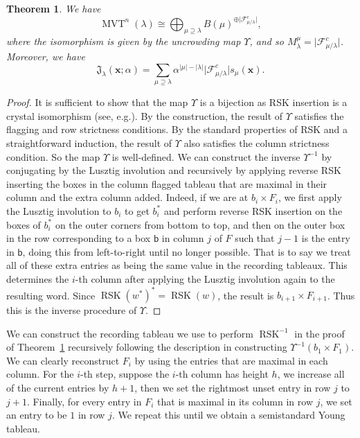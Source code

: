 \documentclass[10pt]{amsart}
\newtheorem{theo}{Theorem}[section]
\theoremstyle{definition}
\providecommand{\eg}{e.g.}
\newcommand{\wG}{\mathfrak{J}}  %
\newcommand{\xx}{\mathbf{x}}
\newcommand{\iso}{\cong}
\newcommand{\bbb}{\mathsf{b}}
\newcommand{\abs}[1]{\lvert #1 \rvert}
\DeclareMathOperator{\mvt}{MVT} %
\DeclareMathOperator{\RSK}{RSK} %
\newcommand{\mcF}{\mathcal{F}}
\begin{document}
\begin{theo}
\label{thm:flagged_decomposition}
We have
\[
\mvt^n(\lambda) \iso \bigoplus_{\mu \supseteq \lambda} B(\mu)^{\oplus \abs{\mcF^c_{\mu/\lambda}}},
\]
where the isomorphism is given by the uncrowding map $\Upsilon$, and so $M_{\lambda}^{\mu} =  \abs{\mcF^c_{\mu/\lambda}}$. Moreover, we have
\[
\wG_{\lambda}(\xx; \alpha) = \sum_{\mu \supseteq \lambda} \alpha^{\abs{\mu}-\abs{\lambda}} \abs{\mcF^c_{\mu/\lambda}} s_{\mu}(\xx).
\]
\end{theo}
\begin{proof}
It is sufficient to show that the map $\Upsilon$ is a bijection as RSK insertion is a crystal isomorphism (see, \eg \cite{BS17,LLT02}). By the construction, the result of $\Upsilon$ satisfies the flagging and row strictness conditions. By the standard properties of RSK and a straightforward induction, the result of $\Upsilon$ also satisfies the column strictness condition. So the map $\Upsilon$ is well-defined. We can construct the inverse $\Upsilon^{-1}$ by conjugating by the Lusztig involution and recursively by applying reverse RSK inserting the boxes in the column flagged tableau that are maximal in their column and the extra column added. Indeed, if we are at $b_i \times F_i$, we first apply the Lusztig involution to $b_i$ to get $b_i^*$ and perform reverse RSK insertion on the boxes of $b_i^*$ on the outer corners from bottom to top, and then on the outer box in the row corresponding to a box $\bbb$ in column $j$ of $F$ such that $j-1$ is the entry in $\bbb$, doing this from left-to-right until no longer possible. That is to say we treat all of these extra entries as being the same value in the recording tableaux. This determines the $i$-th column after applying the Lusztig involution again to the resulting word. Since $\RSK(w^*)^* = \RSK(w)$, the result is $b_{i+1} \times F_{i+1}$. Thus this is the inverse procedure of $\Upsilon$.
\end{proof}
We can construct the recording tableau we use to perform $\RSK^{-1}$ in the proof of Theorem~\ref{thm:flagged_decomposition} recursively following the description in constructing $\Upsilon^{-1}(b_1 \times F_1)$. We can clearly reconstruct $F_i$ by using the entries that are maximal in each column. For the $i$-th step, suppose the $i$-th column has height $h$, we increase all of the current entries by $h+1$, then we set the rightmost unset entry in row $j$ to $j+1$. Finally, for every entry in $F_i$ that is maximal in its column in row $j$, we set an entry to be $1$ in row $j$. We repeat this until we obtain a semistandard Young tableau.
\end{document}
